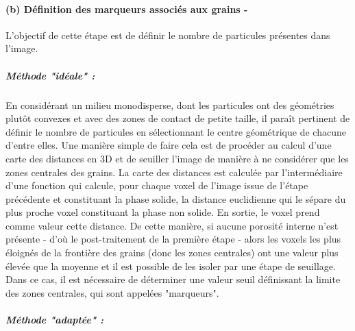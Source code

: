 	\paragraph{(b) Définition des marqueurs associés aux grains -}
		L'objectif de cette étape est de définir le nombre de particules présentes dans l'image.
		\subparagraph{Méthode "idéale" :}En considérant un milieu monodisperse, dont les particules ont des géométries plutôt convexes et avec des zones de contact de petite taille, il paraît pertinent de définir le nombre de particules en sélectionnant le centre géométrique de chacune d'entre elles. Une manière simple de faire cela est de procéder au calcul d'une carte des distances en 3D et de seuiller l'image de manière à ne considérer que les zones centrales des grains. La carte des distances est calculée par l'intermédiaire d'une fonction qui calcule, pour chaque voxel de l'image issue de l'étape précédente et constituant la phase solide, la distance euclidienne qui le sépare du plus proche voxel constituant la phase non solide. En sortie, le voxel prend comme valeur cette distance. De cette manière, si aucune porosité interne n'est présente - d'où le post-traitement de la première étape - alors les voxels les plus éloignés de la frontière des grains (donc les zones centrales) ont une valeur plus élevée que la moyenne et il est possible de les isoler par une étape de seuillage. Dans ce cas, il est nécessaire de déterminer une valeur seuil définissant la limite des zones centrales, qui sont appelées "marqueurs".
		\subparagraph{Méthode "adaptée" :}

